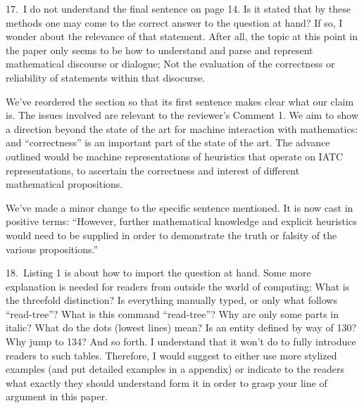 \begin{mdframed}[backgroundcolor=orange!10]
17.~I do not understand the final sentence on page 14. Is it stated that by these methods one may come to the correct answer to the question at hand? If so, I wonder about the relevance of that statement.  After all, the topic at this point in the paper only seems to be how to understand and parse and represent mathematical discourse or dialogue; Not the evaluation of the correctness or reliability of statements within that disocurse. 
\end{mdframed}

We've reordered the section so that its first sentence makes clear
what our claim is.  The issues involved are relevant to the reviewer's
Comment 1.  We aim to show a direction beyond the state of the art for
machine interaction with mathematics: and ``correctness'' is an
important part of the state of the art.  The advance outlined would be
machine representations of heuristics that operate on IATC representations,
to ascertain the correctness and interest of
different mathematical propositions.

We've made a minor change to the specific sentence mentioned.
It is now cast in positive terms:
``However, further mathematical knowledge and explicit heuristics
would need to be supplied in order to demonstrate the truth or falsity
of the various propositions.''


\begin{mdframed}[backgroundcolor=orange!10]
18.~Listing 1 is about how to import the question at hand. Some more explanation is needed for readers from outside the world of computing: What is the threefold distinction? Is everything manually typed, or only what follows ``read-tree''? What is this command ``read-tree''? Why are only some parts in italic? What do the dots (lowest lines) mean? Is an entity defined by way of 130? Why jump to 134? And so forth. I understand that it won't do to fully introduce readers to such tables. Therefore, I would suggest to either use more stylized examples (and put detailed examples in a appendix) or indicate to the readers what exactly they should understand form it in order to grasp your line of argument in this paper.
\end{mdframed}

